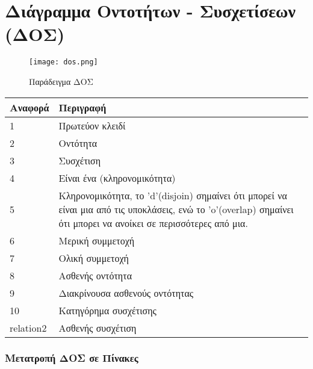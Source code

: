 \section{Διάγραμμα Οντοτήτων - Συσχετίσεων (ΔΟΣ)}

\begin{figure}[H]
	\centering
	\texttt{[image: dos.png]}
	\caption{Παράδειγμα ΔΟΣ}
\end{figure}

\begin{tabularx}{0.9\textwidth}{|X|X|}
	\hline
	{Αναφορά} & {Περιγραφή} \\
	\hline
	{1} & {Πρωτεύον κλειδί} \\
	\hline
	{2} & {Οντότητα} \\
	\hline
	{3} & {Συσχέτιση} \\
	\hline
	{4} & {Είναι ένα (κληρονομικότητα)} \\
	\hline
	{5} & {Κληρονομικότητα, το 'd'(disjoin)  σημαίνει ότι μπορεί να είναι μια από τις υποκλάσεις,
		ενώ το 'o'(overlap) σημαίνει ότι μπορει να ανοίκει σε περισσότερες από μια.} \\
	\hline
	{6} & {Μερική συμμετοχή} \\
	\hline
	{7} & {Ολική συμμετοχή} \\
	\hline
	{8} & {Ασθενής οντότητα} \\
	\hline
	{9} & {Διακρίνουσα ασθενούς οντότητας} \\
	\hline
	{10} & {Κατηγόρημα συσχέτισης} \\
	\hline
	{relation2} & {Ασθενής συσχέτιση} \\
	\hline
\end{tabularx}

\subsubsection{Μετατροπή ΔΟΣ σε Πίνακες}

